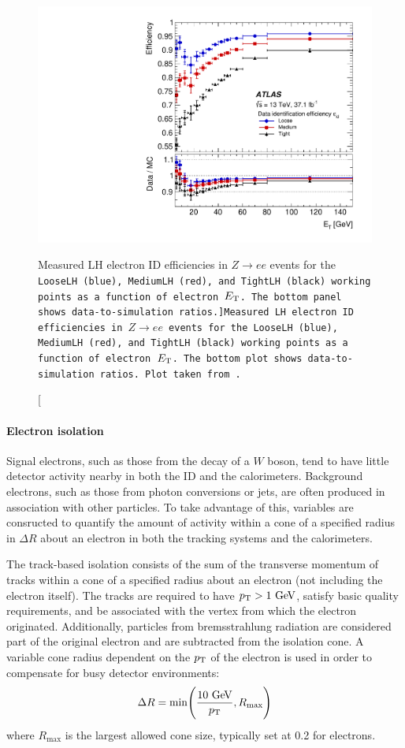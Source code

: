 \begin{figure}[htbp]
  \centering
  \includegraphics[width=.6\textwidth]{figs/detector/electron_id_efficiency}
  \caption[Measured LH electron ID efficiencies in $Z\rightarrow ee$ events for the \tt{LooseLH} (blue), \tt{MediumLH} (red), and \tt{TightLH} (black) working points as a function of electron $E_{\mathrm{T}}$. The bottom panel shows data-to-simulation ratios.]{Measured LH electron ID efficiencies in $Z\rightarrow ee$ events for the \tt{LooseLH} (blue), \tt{MediumLH} (red), and \tt{TightLH} (black) working points as a function of electron $E_{\mathrm{T}}$. The bottom plot shows data-to-simulation ratios. Plot taken from~\cite{2019.electron-reco-id}.}
  \label{fig:electron_id_efficiency}
\end{figure}

\paragraph*{Electron isolation}
Signal electrons, such as those from the decay of a $W$ boson, tend to have little detector activity nearby in both the ID and the calorimeters.
Background electrons, such as those from photon conversions or jets, are often produced in association with other particles.
To take advantage of this, variables are consructed to quantify the amount of activity within a cone of a specified radius in $\Delta R$ about an electron in both the tracking systems and the calorimeters.

The track-based isolation consists of the sum of the transverse momentum of tracks within a cone of a specified radius about an electron (not including the electron itself).
The tracks are required to have $\pt > 1\gev$, satisfy basic quality requirements, and be associated with the vertex from which the electron originated.
Additionally, particles from bremsstrahlung radiation are considered part of the original electron and are subtracted from the isolation cone.
A variable cone radius dependent on the $p_{\mathrm{T}}$ of the electron is used in order to compensate for busy detector environments:
\begin{equation}
  \Delta R = \mathrm{min}\Bigg(\frac{10\gev}{\pt},R_{\textrm{max}}\Bigg)
  \label{eq:varcone}
\end{equation}
where $R_{\textrm{max}}$ is the largest allowed cone size, typically set at 0.2 for electrons.

